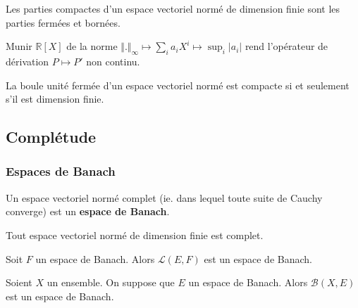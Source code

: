 	\begin{corollary}
		Les parties compactes d'un espace vectoriel normé de dimension finie sont les parties fermées et bornées.
	\end{corollary}

	\begin{cexample}
		Munir $\mathbb{R}[X]$ de la norme $\Vert . \Vert_\infty \mapsto \sum_{i} a_i X^i \mapsto \sup_i \vert a_i \vert$ rend l'opérateur de dérivation $P \mapsto P'$ non continu.
	\end{cexample}


	\begin{theorem}[Riesz]
		La boule unité fermée d'un espace vectoriel normé est compacte si et seulement s'il est dimension finie.
	\end{theorem}

	\subsection{Complétude}

	\subsubsection{Espaces de Banach}


	\begin{definition}
		Un espace vectoriel normé complet (ie. dans lequel toute suite de Cauchy converge) est un \textbf{espace de Banach}.
	\end{definition}


	\begin{example}
		Tout espace vectoriel normé de dimension finie est complet.
	\end{example}

	\begin{example}
		Soit $F$ un espace de Banach. Alors $\mathcal{L}(E,F)$ est un espace de Banach.
	\end{example}


	\begin{example}
		Soient $X$ un ensemble. On suppose que $E$ un espace de Banach. Alors $\mathcal{B}(X,E)$ est un espace de Banach.
	\end{example}


